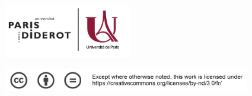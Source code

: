\begin{titlepage}

\begin{figure}[t]
	\includegraphics[width=56.1mm]{logos/Logo_Universite_Paris.png} 
\end{figure}

\begin{figure}[b]
	\includegraphics[width=108.2mm]{logos/creative_commons_pas_de_modifs.png} 
\end{figure}

\end{titlepage}